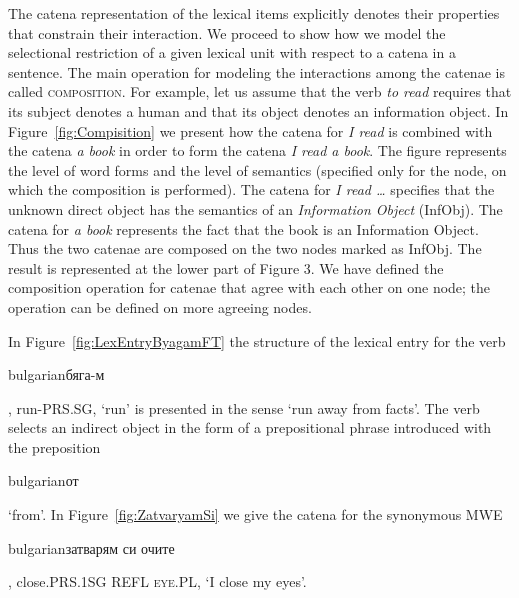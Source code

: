 \documentclass[output=paper]{langsci/langscibook}
\begin{document}
The catena representation of the lexical items explicitly denotes their
properties that constrain their interaction. We proceed to show how we model
the selectional restriction of a given lexical unit with respect to a catena
in a sentence. The main operation for modeling the interactions among the
catenae is called \textsc{composition}. For example, let us assume that the
verb \textit{to read} requires that its subject denotes a human and that its object
denotes an information object. In Figure~\ref{fig:Compisition} we present how
the catena for \textit{I read} is combined with the catena \textit{a book} in order to
form the catena \textit{I read a book}. The figure represents the level of word
forms and the level of semantics (specified only for the node, on which the
composition is performed). The catena for \textit{I read \ldots} specifies that the
unknown direct object has the semantics of an {\em Information Object}
(InfObj). The catena for \textit{a book} represents the fact that the book is an
Information Object. Thus the two catenae are composed on the two nodes
marked as InfObj. The result is represented at the lower part of Figure 3. We have
defined the composition operation for catenae that agree with each other on
one node; the operation can be defined on more agreeing nodes.

In Figure~\ref{fig:LexEntryByagamFT} the structure of the lexical entry for
the verb \begin{otherlanguage*}{bulgarian}бяга-м\end{otherlanguage*}, run-\textsc{PRS.SG}, `run' is presented in the sense `run away from facts'. The
verb selects an indirect object in the form of a prepositional phrase
introduced with the preposition
\begin{otherlanguage*}{bulgarian}от\end{otherlanguage*} `from'. In
Figure~\ref{fig:ZatvaryamSi} we give the catena for the synonymous MWE
\begin{otherlanguage*}{bulgarian}затварям си
очите\end{otherlanguage*}, close.\textsc{PRS.1SG} \textsc{REFL} \textsc{eye.PL}, `I close my
eyes'.
\end{document}
